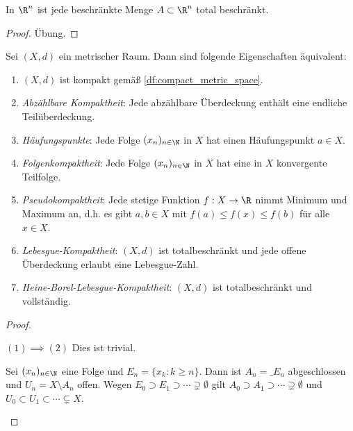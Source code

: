 \begin{prop}
	In $\R^n$ ist jede beschränkte Menge $A \subset \R^n$ total beschränkt.
	\begin{proof}
		Übung.
	\end{proof}
\end{prop}

\begin{st}
	Sei $(X,d)$ ein metrischer Raum.
	Dann sind folgende Eigenschaften äquivalent:
	\begin{enumerate}[(1)]
		\item
			$(X,d)$ ist kompakt gemäß \ref{df:compact_metric_space}.
		\item
			\emph{Abzählbare Kompaktheit}: Jede abzählbare Überdeckung enthält eine endliche Teilüberdeckung.
		\item
			\emph{Häufungspunkte}: Jede Folge $(x_n)_{n\in \N}$ in $X$ hat einen Häufungspunkt $a \in X$.
		\item
			\emph{Folgenkompaktheit}: Jede Folge $(x_n)_{n\in \N}$ in $X$ hat eine in $X$ konvergente Teilfolge.
		\item
			\emph{Pseudokompaktheit}: Jede stetige Funktion $f: X \to \R$ nimmt Minimum und Maximum an, d.h. es gibt $a,b \in X$ mit $f(a) \le f(x) \le f(b)$ für alle $x \in X$.
		\item
			\emph{Lebesgue-Kompaktheit}: $(X,d)$ ist totalbeschränkt und jede offene Überdeckung erlaubt eine Lebesgue-Zahl.
		\item
			\emph{Heine-Borel-Lebesgue-Kompaktheit}: $(X,d)$ ist totalbeschränkt und vollständig.
	\end{enumerate}
	\begin{proof}
		\begin{segnb}{$(1) \implies (2)$}
			Dies ist trivial.
		\end{segnb}
		\begin{seg}[$(2) \implies (3)$]
			Sei $(x_n)_{n\in\N}$ eine Folge und $E_n = \{x_k : k \ge n\}$.
			Dann ist $A_n = \_{E_n}$ abgeschlossen und $U_n = X \setminus A_n$ offen.
			Wegen $E_0 \supset E_1 \supset \dotsb \supsetneq \emptyset$ gilt $A_0 \supset A_1 \supset \dotsb \supsetneq \emptyset$ und $U_0 \subset U_1 \subset \dotsb \subsetneq X$.


\end{seg}
\end{proof}
\end{st}
